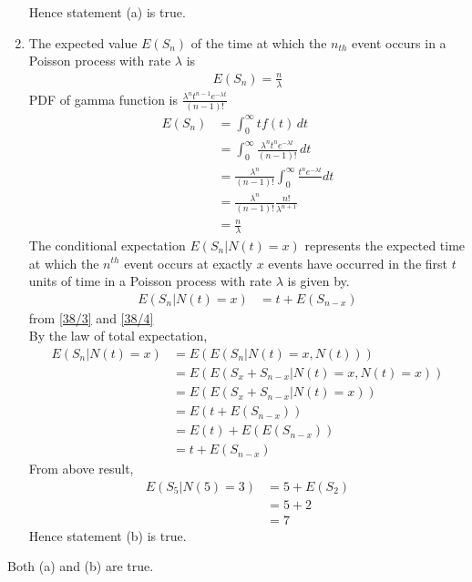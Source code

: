 \documentclass[journal,12pt,onecolumn]{IEEEtran}
\theoremstyle{remark}
\begin{document}
\begin{enumerate}[label=(\alph*)]
 Hence statement (a) is true.
\item The expected value $E(S_n)$ of the time at which the $n_{th}$ event occurs in a Poisson process with rate $\lambda$ is\\
\begin{align}
E(S_n)=\frac{n}{\lambda}
\end{align}
PDF of gamma function is $\frac{\lambda^nt^{n-1}e^{-\lambda t}}{(n-1)!}$\\
\begin{align}
E(S_n)&=\int_{0}^{\infty} tf(t) \, dt\\
&=\int_{0}^{\infty}\frac{\lambda^nt^ne^{-\lambda t}}{(n-1)!}\,dt \\
&=\frac{\lambda^n}{(n-1)!}\int_{0}^{\infty}\frac{t^ne^{-\lambda t}} \,dt\\
&=\frac{\lambda^n}{(n-1)!}\frac{n!}{\lambda ^{n+1}}\\
&=\frac{n}{\lambda} \label{38/3}
\end{align}
The conditional expectation $E(S_n|N(t)=x)$ represents the expected time at which the $n^{th}$ event occurs at exactly $x$ events have occurred in the first $t$ units of time in a Poisson process with rate $\lambda$ is given by.\\
\begin{align}
E(S_n|N(t)=x)&=t+E(S_{n-x})\label{38/4}
\end{align}
from \eqref{38/3} and \eqref{38/4}\\
By the law of total expectation,
\begin{align}
E(S_n | N(t) = x) &= E(E(S_n | N(t) = x, N(t))) \\
&= E(E(S_x + S_{n-x} | N(t) = x, N(t) = x))\\
&= E(E(S_x + S_{n-x} | N(t) = x))\\
&=E(t + E(S_{n-x})) \\
&=E(t) + E(E(S_{n-x}))\\
 &= t + E(S_{n-x})
 \end{align}
 From above result,
 \begin{align}
 E(S_5|N(5)=3)&=5+E(S_2)\\
 &=5+2\\
 &=7
 \end{align}
 Hence statement (b) is true.
\end{enumerate}
Both (a) and (b) are true.
\end{document}
